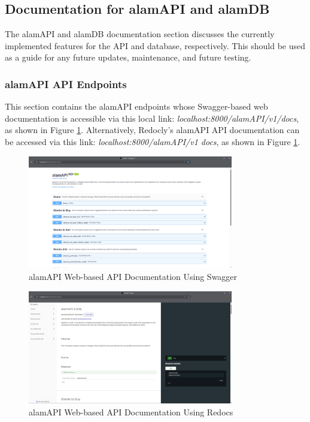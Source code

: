 \subsection{Documentation for alamAPI and alamDB}
\label{subsubsec:doc_API_DB}
The alamAPI and alamDB documentation section discusses the currently implemented 
features for the API and database, respectively. This should be used as a guide 
for any future updates, maintenance, and future testing.

\subsubsection{alamAPI API Endpoints}
\label{subsubsec:alamAPI_API_endpoints}
This section contains the alamAPI endpoints whose Swagger-based web 
documentation is accessible via this local link: \textit{localhost:8000/alamAPI/v1/docs},
as shown in Figure \ref{fig:alamapi_swagger}. 
Alternatively, Redocly's alamAPI API documentation can be accessed via this 
link: \textit{localhost:8000/alamAPI/v1 docs},
as shown in Figure \ref{fig:alamapi_swagger}.
\\

\begin{figure}[ht]
    \centering
    \includegraphics[width=0.80\textwidth]{./assets/Chapter_4/Documentation/alamAPI_swagger.png}
    \caption{alamAPI Web-based API Documentation Using Swagger}
    \label{fig:alamapi_swagger}
\end{figure}
\FloatBarrier

\begin{figure}[ht]
    \centering
    \includegraphics[width=0.80\textwidth]{./assets/Chapter_4/Documentation/alamAPI_redoc.png}
    \caption{alamAPI Web-based API Documentation Using Redocs}
    \label{fig:alamAPI_redoc}
\end{figure}
\FloatBarrier

